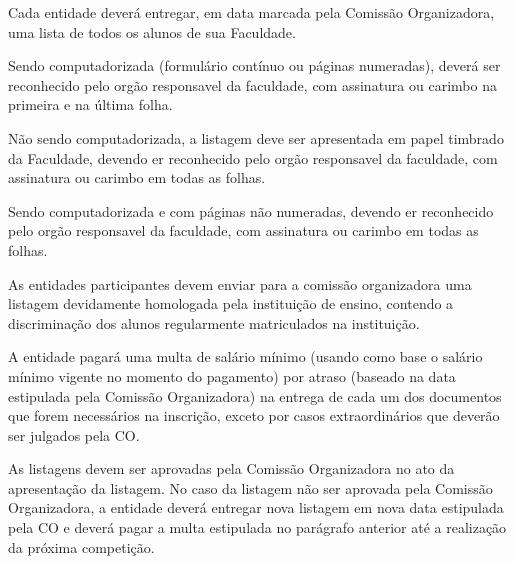 \begin{article}
	Cada entidade deverá entregar, em data marcada pela Comissão Organizadora, uma lista de todos os alunos de sua Faculdade.

	\begin{xparagraph}
		Sendo computadorizada (formulário contínuo ou páginas numeradas), deverá ser reconhecido pelo orgão responsavel da faculdade, com assinatura ou carimbo na primeira e na última folha.
	\end{xparagraph}

	\begin{xparagraph}
		Não sendo computadorizada, a listagem deve ser apresentada em papel timbrado da Faculdade, devendo er reconhecido pelo orgão responsavel da faculdade, com assinatura ou carimbo em todas as folhas.
	\end{xparagraph}

	\begin{xparagraph}
		Sendo computadorizada e com páginas não numeradas, devendo er reconhecido pelo orgão responsavel da faculdade, com assinatura ou carimbo em todas as folhas.
	\end{xparagraph}

	\begin{xparagraph}
		As entidades participantes devem enviar para a comissão organizadora uma listagem devidamente homologada pela instituição de ensino, contendo a discriminação dos alunos regularmente matriculados na instituição.
	\end{xparagraph}

	\begin{xparagraph}
		A entidade pagará uma multa de  salário mínimo (usando como base o salário mínimo vigente no momento do pagamento) por atraso (baseado na data estipulada pela Comissão Organizadora) na entrega de cada um dos documentos que forem necessários na inscrição, exceto por casos extraordinários que deverão ser julgados pela CO.
	\end{xparagraph}

	\begin{xparagraph}
		As listagens devem ser aprovadas pela Comissão Organizadora no ato da apresentação da listagem. No caso da listagem não ser aprovada pela Comissão Organizadora, a entidade deverá entregar nova listagem em nova data estipulada pela CO e deverá pagar a multa estipulada no parágrafo anterior até a realização da próxima competição.
	\end{xparagraph}
\end{article}

